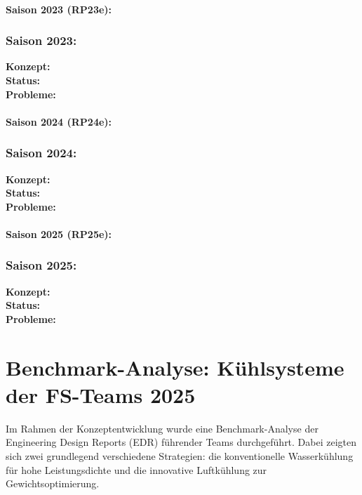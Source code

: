
\paragraph{Saison 2023 (RP23e):} 

\subsubsection{Saison 2023: }
\textbf{Konzept:}  \\
\textbf{Status:}  \\
\textbf{Probleme:} 



\paragraph{Saison 2024 (RP24e):} 

\subsubsection{Saison 2024: }
\textbf{Konzept:}  \\
\textbf{Status:}  \\
\textbf{Probleme:} 

\paragraph{Saison 2025 (RP25e):} 

\subsubsection{Saison 2025: }
\textbf{Konzept:}  \\
\textbf{Status:}  \\
\textbf{Probleme:} 

\section{Benchmark-Analyse: Kühlsysteme der FS-Teams 2025}

Im Rahmen der Konzeptentwicklung wurde eine Benchmark-Analyse der Engineering Design Reports (EDR) führender Teams durchgeführt. Dabei zeigten sich zwei grundlegend verschiedene Strategien: die konventionelle Wasserkühlung für hohe Leistungsdichte und die innovative Luftkühlung zur Gewichtsoptimierung.

